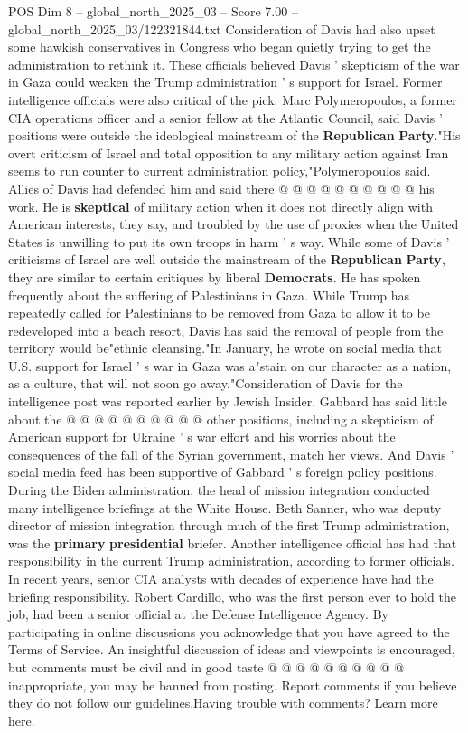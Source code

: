 \begin{textsample}{POS Dim 8 – global\_north\_2025\_03 – Score 7.00 – global\_north\_2025\_03/122321844.txt}
Consideration of Davis had also upset some hawkish conservatives in Congress who began quietly trying to get the administration to rethink it.
These officials believed Davis ' skepticism of the war in Gaza could weaken the Trump administration ' s support for Israel.
Former intelligence officials were also critical of the pick.
Marc Polymeropoulos, a former CIA operations officer and a senior fellow at the Atlantic Council, said Davis ' positions were outside the ideological mainstream of the \textbf{Republican} \textbf{Party}."His overt criticism of Israel and total opposition to any military action against Iran seems to run counter to current administration policy,"Polymeropoulos said.
Allies of Davis had defended him and said there @ @ @ @ @ @ @ @ @ @ his work.
He is \textbf{skeptical} of military action when it does not directly align with American interests, they say, and troubled by the use of proxies when the United States is unwilling to put its own troops in harm ' s way.
While some of Davis ' criticisms of Israel are well outside the mainstream of the \textbf{Republican} \textbf{Party}, they are similar to certain critiques by liberal \textbf{Democrats}.
He has spoken frequently about the suffering of Palestinians in Gaza.
While Trump has repeatedly called for Palestinians to be removed from Gaza to allow it to be redeveloped into a beach resort, Davis has said the removal of people from the territory would be"ethnic cleansing."In January, he wrote on social media that U.S. support for Israel ' s war in Gaza was a"stain on our character as a nation, as a culture, that will not soon go away."Consideration of Davis for the intelligence post was reported earlier by Jewish Insider.
Gabbard has said little about the @ @ @ @ @ @ @ @ @ @ other positions, including a skepticism of American support for Ukraine ' s war effort and his worries about the consequences of the fall of the Syrian government, match her views.
And Davis ' social media feed has been supportive of Gabbard ' s foreign policy positions.
During the Biden administration, the head of mission integration conducted many intelligence briefings at the White House.
Beth Sanner, who was deputy director of mission integration through much of the first Trump administration, was the \textbf{primary} \textbf{presidential} briefer.
Another intelligence official has had that responsibility in the current Trump administration, according to former officials.
In recent years, senior CIA analysts with decades of experience have had the briefing responsibility.
Robert Cardillo, who was the first person ever to hold the job, had been a senior official at the Defense Intelligence Agency.
By participating in online discussions you acknowledge that you have agreed to the Terms of Service.
An insightful discussion of ideas and viewpoints is encouraged, but comments must be civil and in good taste @ @ @ @ @ @ @ @ @ @ inappropriate, you may be banned from posting.
Report comments if you believe they do not follow our guidelines.Having trouble with comments?
Learn more here.

\end{textsample}
